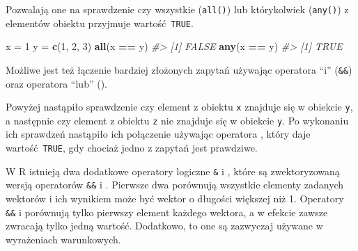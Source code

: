 \documentclass[paper=6in:9in,pagesize=pdftex,headinclude=on,footinclude=on,10pt]{scrbook}
\makeatletter
\newenvironment{Shaded}{\begin{snugshade}}{\end{snugshade}}
\newcommand{\CommentTok}[1]{\textcolor[rgb]{0.56,0.35,0.01}{\textit{#1}}}
\newcommand{\DecValTok}[1]{\textcolor[rgb]{0.00,0.00,0.81}{#1}}
\newcommand{\KeywordTok}[1]{\textcolor[rgb]{0.13,0.29,0.53}{\textbf{#1}}}
\newcommand{\NormalTok}[1]{#1}
\newcommand{\OperatorTok}[1]{\textcolor[rgb]{0.81,0.36,0.00}{\textbf{#1}}}
\newcommand{\StringTok}[1]{\textcolor[rgb]{0.31,0.60,0.02}{#1}}
\newenvironment{kframe}{%
\medskip{}
\setlength{\fboxsep}{.8em}
 \def\at@end@of@kframe{}%
 \ifinner\ifhmode%
  \def\at@end@of@kframe{\end{minipage}}%
  \begin{minipage}{\columnwidth}%
 \fi\fi%
 \def\FrameCommand##1{\hskip\@totalleftmargin \hskip-\fboxsep
 \colorbox{shadecolor}{##1}\hskip-\fboxsep
     \hskip-\linewidth \hskip-\@totalleftmargin \hskip\columnwidth}%
 \MakeFramed {\advance\hsize-\width
   \@totalleftmargin\z@ \linewidth\hsize
   \@setminipage}}%
 {\par\unskip\endMakeFramed%
 \at@end@of@kframe}
\newenvironment{rmdblock}[1]
  {
  \begin{itemize}
  \renewcommand{\labelitemi}{
    \raisebox{-.7\height}[0pt][0pt]{
      {\setkeys{Gin}{width=3em,keepaspectratio}\texttt{[image: images/\#1]}}
    }
  }
  \setlength{\fboxsep}{1em}
  \begin{kframe}
  \item
  }
  {
  \end{kframe}
  \end{itemize}
  }
\newenvironment{rmdinfo}
  {\begin{rmdblock}{compass}}
  {\end{rmdblock}}
\makeatother
\begin{document}
Pozwalają one na sprawdzenie czy wszystkie (\texttt{all()}) lub którykolwiek (\texttt{any()}) z elementów obiektu przyjmuje wartość~\texttt{TRUE}.

\begin{Shaded}
\begin{Highlighting}[]
\NormalTok{x =}\StringTok{ }\DecValTok{1}
\NormalTok{y =}\StringTok{ }\KeywordTok{c}\NormalTok{(}\DecValTok{1}\NormalTok{, }\DecValTok{2}\NormalTok{, }\DecValTok{3}\NormalTok{)}
\KeywordTok{all}\NormalTok{(x }\OperatorTok{==}\StringTok{ }\NormalTok{y)}
\CommentTok{#> [1] FALSE}
\KeywordTok{any}\NormalTok{(x }\OperatorTok{==}\StringTok{ }\NormalTok{y)}
\CommentTok{#> [1] TRUE}
\end{Highlighting}
\end{Shaded}

Możliwe jest też łączenie bardziej złożonych zapytań używając operatora ``i'' (\texttt{\&\&}) oraz operatora ``lub'' (\texttt{\textbar{}\textbar{}}).

\begin{Shaded}
\end{Shaded}

Powyżej nastąpiło sprawdzenie czy element z obiektu \texttt{x} znajduje się w obiekcie \texttt{y}, a następnie czy element z obiektu \texttt{z} nie znajduje się w obiekcie \texttt{y}.
Po wykonaniu ich sprawdzeń nastąpiło ich połączenie używając operatora \texttt{\textbar{}\textbar{}}, który daje wartość~\texttt{TRUE}, gdy chociaż jedno z zapytań jest prawdziwe.

\begin{rmdinfo}
W R istnieją dwa dodatkowe operatory logiczne \texttt{\&} i \texttt{\textbar{}}, które są zwektoryzowaną wersją operatorów \texttt{\&\&} i \texttt{\textbar{}\textbar{}}.
Pierwsze dwa porównują wszystkie elementy zadanych wektorów i ich wynikiem może być wektor o długości większej niż 1.
Operatory \texttt{\&\&} i \texttt{\textbar{}\textbar{}} porównują tylko pierwszy element każdego wektora, a w efekcie zawsze zwracają tylko jedną wartość.
Dodatkowo, to one są zazwyczaj używane w wyrażeniach warunkowych.
\end{rmdinfo}
\end{document}

